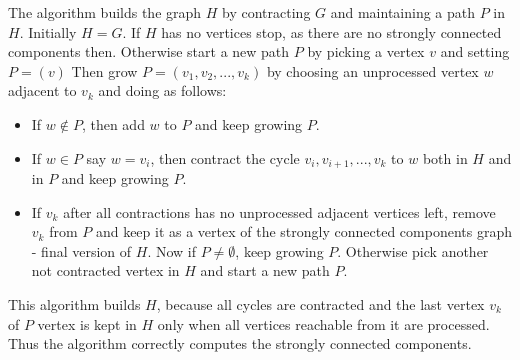 \documentclass{report}
\theoremstyle{plain}
\theoremstyle{definition}
\theoremstyle{remark}
\numberwithin{definition}{chapter}
\numberwithin{example}{chapter}
\numberwithin{figure}{chapter}
\begin{document}
The algorithm builds the graph $H$ by contracting $G$ and maintaining a path $P$ in $H$. Initially $H=G$. If $H$ has no vertices stop, as there are no strongly connected components then. Otherwise start a new path $P$ by picking a vertex $v$ and setting $P = (v)$ Then grow $P=(v_1,v_2,...,v_k)$ by choosing an unprocessed vertex $w$ adjacent to $v_k$ and doing as follows:

\begin{itemize}
  \item If $w \not \in P$, then add $w$ to $P$ and keep growing $P$.
  \item If $w \in P$ say $w=v_i$, then contract the cycle $v_i,v_{i+1},...,v_k$ to $w$ both in $H$ and in $P$ and keep growing $P$.
  \item If $v_k$ after all contractions has no unprocessed adjacent vertices left, remove $v_k$ from $P$ and keep it as a vertex of the strongly connected components graph - final version of $H$. Now if $P \not = \emptyset$, keep growing $P$. Otherwise pick another not contracted vertex in $H$ and start a new path $P$.
\end{itemize}

This algorithm builds $H$, because all cycles are contracted and the last vertex $v_k$ of $P$ vertex is kept in $H$ only when all vertices reachable from it are processed. Thus the algorithm correctly computes the strongly connected components.
\end{document}
